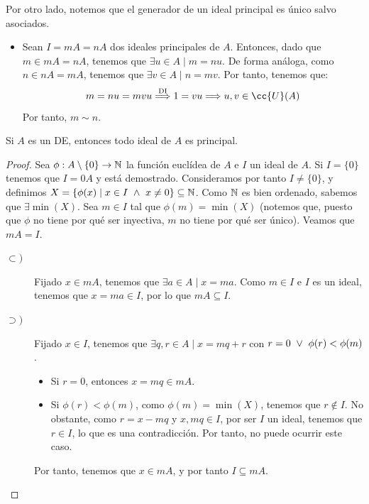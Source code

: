 Por otro lado, notemos que el generador de un ideal principal es único salvo asociados.
\begin{itemize}
    \item Sean $I=mA=nA$ dos ideales principales de $A$. Entonces, dado que $m\in mA=nA$, tenemos que $\exists u \in A \mid m=nu$. De forma análoga, como $n\in nA=mA$, tenemos que $\exists v \in A \mid n=mv$. Por tanto, tenemos que:
    $$m=nu=mvu\stackrel{\text{DI}}{\Longrightarrow} 1=vu \Longrightarrow u,v \in \cc{U}(A)$$
    Por tanto, $m\sim n$.
\end{itemize}

\begin{teo}
    \label{teo:TodoIdealPrincipalDE}
    Si $A$ es un DE, entonces todo ideal de $A$ es principal.
\end{teo}
\begin{proof}
    Sea $\phi:A\setminus\{0\}\rightarrow\mathbb N$ la función euclídea de $A$ e $I$ un ideal de $A$. Si $I=\{0\}$ tenemos que $I = 0A$ y está demostrado. Consideramos por tanto $I \neq \{0\}$, y definimos $X = \{\phi(x) \mid x \in I \ \land \  x \neq 0\} \subseteq \mathbb N$. Como $\mathbb N$ es bien ordenado, sabemos que $\exists \min(X)$. Sea $m \in I$ tal que $\phi(m) = \min(X)$ (notemos que, puesto que $\phi$ no tiene por qué ser inyectiva, $m$ no tiene por qué ser único). Veamos que $mA = I$.
    \begin{description}
        \item[$\subset)$] Fijado $x\in mA$, tenemos que $\exists a \in A \mid x=ma$. Como $m\in I$ e $I$ es un ideal, tenemos que $x=ma \in I$, por lo que $mA \subseteq I$.
        \item[$\supset)$] Fijado $x\in I$, tenemos que $\exists q,r \in A \mid x=mq+r$ con $r=0 \ \lor \  \phi(r) < \phi(m)$.
        \begin{itemize}
            \item Si $r=0$, entonces $x=mq \in mA$.
            \item Si $\phi(r) < \phi(m)$, como $\phi(m)=\min(X)$, tenemos que $r\notin I$. No obstante, como $r=x-mq$ y $x,mq \in I$, por ser $I$ un ideal, tenemos que $r \in I$, lo que es una contradicción. Por tanto, no puede ocurrir este caso.
        \end{itemize}
        Por tanto, tenemos que $x\in mA$, y por tanto $I \subseteq mA$.
    \end{description}
\end{proof}

